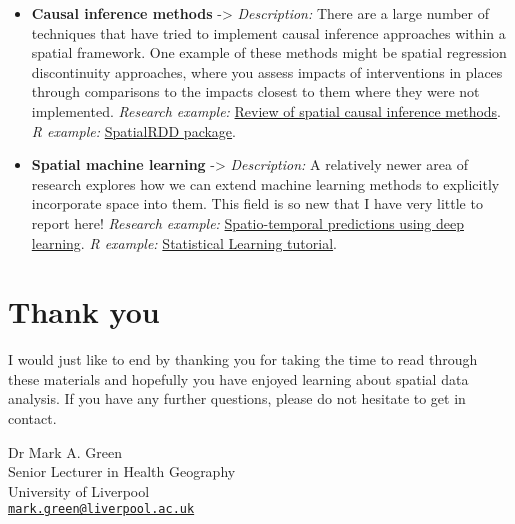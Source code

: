 \documentclass[
]{book}
\begin{document}
\begin{itemize}
\item
  \textbf{Causal inference methods} -\textgreater{} \emph{Description:} There are a large number of techniques that have tried to implement causal inference approaches within a spatial framework. One example of these methods might be spatial regression discontinuity approaches, where you assess impacts of interventions in places through comparisons to the impacts closest to them where they were not implemented. \emph{Research example:} \href{https://arxiv.org/abs/2007.02714}{Review of spatial causal inference methods}. \emph{R example:} \href{https://github.com/axlehner/SpatialRDD}{SpatialRDD package}.
\item
  \textbf{Spatial machine learning} -\textgreater{} \emph{Description:} A relatively newer area of research explores how we can extend machine learning methods to explicitly incorporate space into them. This field is so new that I have very little to report here! \emph{Research example:} \href{https://www.nature.com/articles/s41598-020-79148-7}{Spatio-temporal predictions using deep learning}. \emph{R example:} \href{https://geocompr.robinlovelace.net/spatial-cv.html}{Statistical Learning tutorial}.
\end{itemize}

\hypertarget{thank-you}{%
\section{Thank you}\label{thank-you}}

I would just like to end by thanking you for taking the time to read through these materials and hopefully you have enjoyed learning about spatial data analysis. If you have any further questions, please do not hesitate to get in contact.

Dr Mark A. Green\\
Senior Lecturer in Health Geography\\
University of Liverpool\\
\href{mailto:mark.green@liverpool.ac.uk}{\nolinkurl{mark.green@liverpool.ac.uk}}

  
\end{document}
